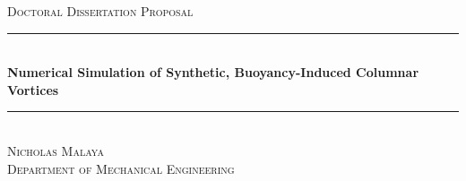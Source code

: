 \begin{titlepage}

\newcommand{\HRule}{\rule{\linewidth}{0.5mm}} %

\center %
 

\textsc{\LARGE Doctoral Dissertation Proposal}\\[1.0cm] %


\HRule \\[0.4cm]
{ \Large \bfseries Numerical Simulation of Synthetic, Buoyancy-Induced Columnar Vortices}\\[0.4cm] %
\HRule \\[1.5cm]
\textsc{\Large Nicholas Malaya}\\[0.5cm] %
\textsc{\large Department of Mechanical Engineering}\\[1.0cm] %
 


\end{titlepage}
